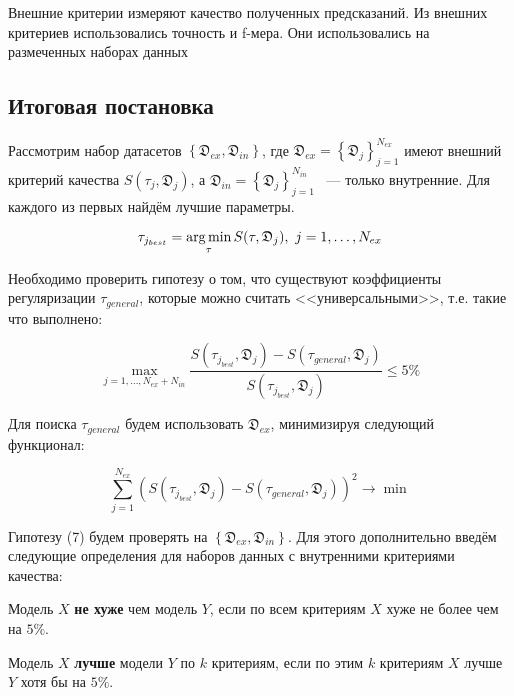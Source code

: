 \documentclass[12pt,twoside]{article}
\begin{document}
	Внешние критерии измеряют качество полученных предсказаний. Из внешних критериев использовались точность и f-мера. Они использовались на размеченных наборах данных
	
	\subsection{Итоговая постановка}
	
	Рассмотрим набор датасетов $\left\{\mathfrak{D}_{ex}, \mathfrak{D}_{in}\right\}$, где  $\mathfrak{D}_{ex} = \left\{\mathfrak{D}_j\right\}_{j=1}^{N_{ex}}$ имеют внешний критерий качества $S(\tau_j, \mathfrak{D}_j)$, а $\mathfrak{D}_{in} = \left\{\mathfrak{D}_j\right\}_{j=1}^{N_{in}}$~ --- только внутренние. Для каждого из первых найдём лучшие параметры.
	
	\begin{equation}
	\tau_{j_{best}} = \argmin_{\tau} S(\tau, \mathfrak{D}_j) ,\ j = 1,\dots , N_{ex}
	\end{equation}
	
	Необходимо проверить гипотезу о том, что существуют коэффициенты регуляризации $\tau_{general}$, которые можно считать <<универсальными>>, т.е. такие что выполнено:
	
	\begin{equation}
	\max_{j=1,\dots,N_{ex}+N_{in}} \frac{S(\tau_{j_{best}}, \mathfrak{D}_j)- S(\tau_{general}, \mathfrak{D}_j)}{S(\tau_{j_{best}}, \mathfrak{D}_j)} \leq 5\%
	\end{equation}
	
	Для поиска $\tau_{general}$ будем использовать $\mathfrak{D}_{ex}$, минимизируя следующий функционал:
	
	\begin{equation}
	\sum_{j=1}^{N_{ex}} \left(S(\tau_{j_{best}}, \mathfrak{D}_j)- S(\tau_{general}, \mathfrak{D}_j)\right)^2 \to \min
	\end{equation}
	
	Гипотезу (7) будем проверять на $\left\{\mathfrak{D}_{ex}, \mathfrak{D}_{in}\right\}$. Для этого дополнительно введём следующие определения для наборов данных с внутренними критериями качества:
	
	\begin{Def}
		Модель $X$ {\bf не хуже} чем модель $Y$, если по всем критериям $X$ хуже не более чем на $5\%$.
	\end{Def}
	
	\begin{Def}
		Модель $X$ {\bf лучше} модели $Y$ по $k$ критериям, если по этим $k$ критериям $X$ лучше $Y$ хотя бы на $5\%$.
	\end{Def}
	
\end{document}
